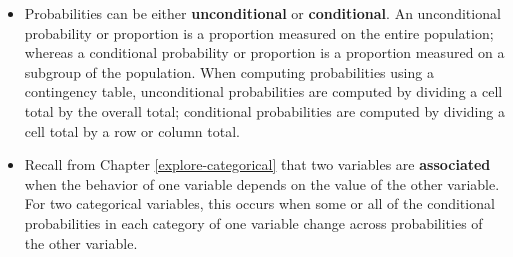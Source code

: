 \documentclass[
  10pt,
  openany]{book}
\theoremstyle{definition}
\theoremstyle{definition}
\theoremstyle{definition}
\theoremstyle{definition}
\theoremstyle{remark}
\begin{document}
\begin{itemize}
\item
  Probabilities can be either \textbf{unconditional} or \textbf{conditional}. An unconditional probability or proportion is a proportion measured on the entire population; whereas a conditional probability or proportion is a proportion measured on a subgroup of the population. When computing probabilities using a contingency table, unconditional probabilities are computed by dividing a cell total by the overall total; conditional probabilities are computed by dividing a cell total by a row or column total.
\item
  Recall from Chapter \ref{explore-categorical} that two variables are \textbf{associated} when the behavior of one variable depends on the value of the other variable. For two categorical variables, this occurs when some or all of the conditional probabilities in each category of one variable change across probabilities of the other variable.
\end{itemize}

  
\end{document}
